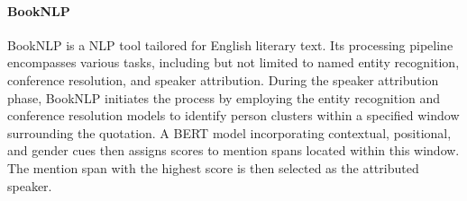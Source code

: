 \documentclass[letterpaper]{article} %
\begin{document}





\paragraph{BookNLP}
BookNLP is a NLP tool tailored for English literary text. Its processing pipeline encompasses various tasks, including but not limited to named entity recognition, conference resolution, and speaker attribution. During the speaker attribution phase, BookNLP initiates the process by employing the entity recognition and conference resolution models to identify person clusters within a specified window surrounding the quotation. A BERT model incorporating contextual, positional, and gender cues then assigns scores to mention spans located within this window. The mention span with the highest score is then selected as the attributed speaker.
\end{document}
